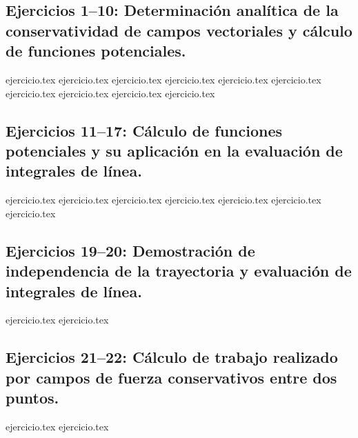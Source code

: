 
\subsection*{Ejercicios 1--10: Determinación analítica de la conservatividad de campos vectoriales y cálculo de funciones potenciales.}
\begin{enumerate}
    {ejercicio.tex}
    {ejercicio.tex}
    {ejercicio.tex}
    {ejercicio.tex}
    {ejercicio.tex}
    {ejercicio.tex}
    {ejercicio.tex}
    {ejercicio.tex}
    {ejercicio.tex}
    {ejercicio.tex}
\end{enumerate}

\subsection*{Ejercicios 11--17: Cálculo de funciones potenciales y su aplicación en la evaluación de integrales de línea.}
\begin{enumerate}
    \setcounter{enumi}{10}
    {ejercicio.tex}
    {ejercicio.tex}
    {ejercicio.tex}
    {ejercicio.tex}
    {ejercicio.tex}
    {ejercicio.tex}
    {ejercicio.tex}
\end{enumerate}

\subsection*{Ejercicios 19--20: Demostración de independencia de la trayectoria y evaluación de integrales de línea.}
\begin{enumerate}
    \setcounter{enumi}{18}
    {ejercicio.tex}
    {ejercicio.tex}
\end{enumerate}

\subsection*{Ejercicios 21--22: Cálculo de trabajo realizado por campos de fuerza conservativos entre dos puntos.}
\begin{enumerate}
    \setcounter{enumi}{20}
    {ejercicio.tex}
    {ejercicio.tex}
\end{enumerate}

